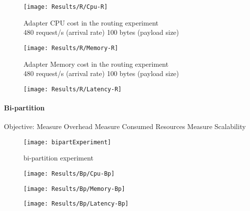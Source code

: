 \begin{figure}[htbp]
    \centering
    \texttt{[image: Results/R/Cpu-R]}
    \caption{Adapter CPU cost in the routing experiment \\\hspace{\textwidth} 480 request/s (arrival rate) 100 bytes (payload size)}
    \label{fig:routCpu}
\end{figure}

\begin{figure}[htbp]
    \centering
    \texttt{[image: Results/R/Memory-R]}
    \caption{Adapter Memory cost in the routing experiment \\\hspace{\textwidth} 480 request/s (arrival rate) 100 bytes (payload size)}
    \label{fig:routMem}
\end{figure}

\begin{figure}[htbp]
    \centering
    \texttt{[image: Results/R/Latency-R]}
    \label{fig:gantt}
\end{figure}

\newpage



\paragraph{Bi-partition}

Objective:
Measure Overhead
Measure Consumed Resources
Measure Scalability

\begin{figure}[htbp]
    \centering
    \texttt{[image: bipartExperiment]}
    \caption{bi-partition experiment}
    \label{fig:gantt}
\end{figure}

\begin{figure}[htbp]
    \centering
    \texttt{[image: Results/Bp/Cpu-Bp]}
    \label{fig:gantt}
\end{figure}

\begin{figure}[htbp]
    \centering
    \texttt{[image: Results/Bp/Memory-Bp]}
    \label{fig:gantt}
\end{figure}

\begin{figure}[htbp]
    \centering
    \texttt{[image: Results/Bp/Latency-Bp]}
    \label{fig:gantt}
\end{figure}